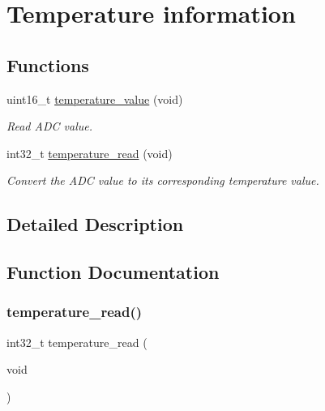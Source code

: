 \hypertarget{group___temperature___data}{}\section{Temperature information}
\label{group___temperature___data}
\subsection*{Functions}
\begin{DoxyCompactItemize}
\item 
uint16\+\_\+t \hyperlink{group___temperature___data_ga74915aedf88ee7840a64ab372d768ca1}{temperature\+\_\+value} (void)
\begin{DoxyCompactList}\small\item\em Read A\+DC value. \end{DoxyCompactList}\item 
int32\+\_\+t \hyperlink{group___temperature___data_gad2e261b9f6af30d5857f1e2a892a9592}{temperature\+\_\+read} (void)
\begin{DoxyCompactList}\small\item\em Convert the A\+DC value to its corresponding temperature value. \end{DoxyCompactList}\end{DoxyCompactItemize}


\subsection{Detailed Description}


\subsection{Function Documentation}
\mbox{\label{group___temperature___data_gad2e261b9f6af30d5857f1e2a892a9592}} 
\subsubsection{\texorpdfstring{temperature\+\_\+read()}{temperature\_read()}}
{\footnotesize\ttfamily int32\+\_\+t temperature\+\_\+read (\begin{DoxyParamCaption}\item[{void}]{ }\end{DoxyParamCaption})}



